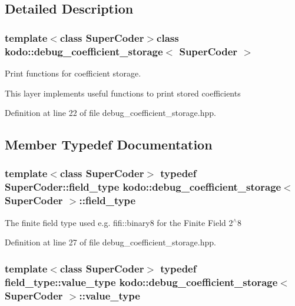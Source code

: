 \subsection{Detailed Description}
\subsubsection*{template$<$class Super\-Coder$>$class kodo\-::debug\-\_\-coefficient\-\_\-storage$<$ Super\-Coder $>$}

Print functions for coefficient storage. 

This layer implements useful functions to print stored coefficients 

Definition at line 22 of file debug\-\_\-coefficient\-\_\-storage.\-hpp.



\subsection{Member Typedef Documentation}
\hypertarget{classkodo_1_1debug__coefficient__storage_a84bcc1645af839927355175c06c9ab6a}{
\subsubsection[{field\-\_\-type}]{\setlength{\rightskip}{0pt plus 5cm}template$<$class Super\-Coder$>$ typedef Super\-Coder\-::field\-\_\-type {\bf kodo\-::debug\-\_\-coefficient\-\_\-storage}$<$ Super\-Coder $>$\-::{\bf field\-\_\-type}}}\label{classkodo_1_1debug__coefficient__storage_a84bcc1645af839927355175c06c9ab6a}




The finite field type used e.\-g. fifi\-::binary8 for the Finite Field 2$^\wedge$8 

Definition at line 27 of file debug\-\_\-coefficient\-\_\-storage.\-hpp.

\hypertarget{classkodo_1_1debug__coefficient__storage_a11acae745ea1f84a2e73816e4dfe64ec}{
\subsubsection[{value\-\_\-type}]{\setlength{\rightskip}{0pt plus 5cm}template$<$class Super\-Coder$>$ typedef field\-\_\-type\-::value\-\_\-type {\bf kodo\-::debug\-\_\-coefficient\-\_\-storage}$<$ Super\-Coder $>$\-::{\bf value\-\_\-type}}}\label{classkodo_1_1debug__coefficient__storage_a11acae745ea1f84a2e73816e4dfe64ec}




